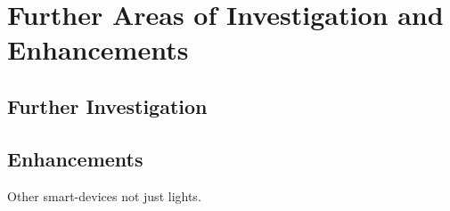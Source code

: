 \section{Further Areas of Investigation and
Enhancements}\label{further-areas-of-investigation-and-enhancements}

\subsection{Further Investigation}\label{further-investigation}

\subsection{Enhancements}\label{enhancements}

Other smart-devices not just lights.

